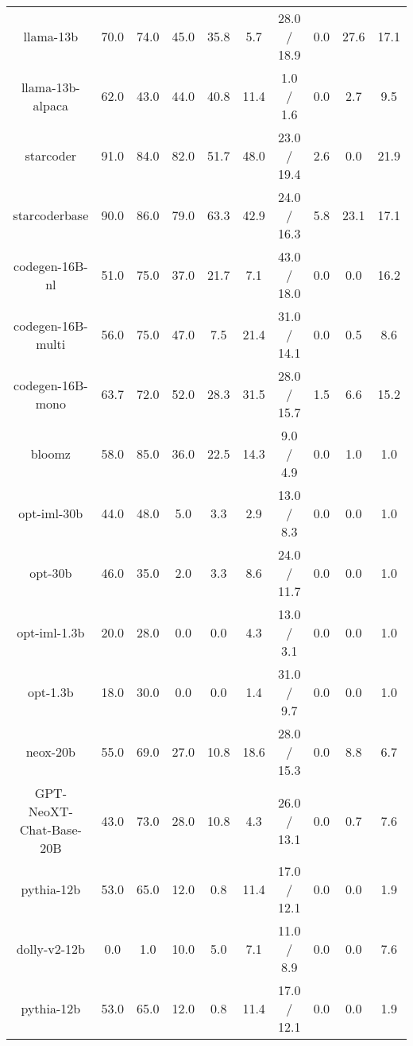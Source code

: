 \begin{table}[]
\begin{adjustbox}{max width=\textwidth}
\begin{tabular}{@{}cccccccccc@{}}
llama-13b               & 70.0 & 74.0 & 45.0 & 35.8 & 5.7  & 28.0 / 18.9 & 0.0 & 27.6 & 17.1 \\
llama-13b-alpaca   & 62.0 & 43.0 & 44.0 & 40.8 & 11.4 & 1.0 / 1.6   & 0.0 & 2.7  & 9.5  \\
\cmidrule(lr){1-1}
starcoder               & 91.0 & 84.0 & 82.0 & 51.7 & 48.0 & 23.0 / 19.4 & 2.6 & 0.0  & 21.9 \\
starcoderbase           & 90.0 & 86.0 & 79.0 & 63.3 & 42.9 & 24.0 / 16.3 & 5.8 & 23.1 & 17.1 \\
\cmidrule(lr){1-1}
codegen-16B-nl          & 51.0 & 75.0 & 37.0 & 21.7 & 7.1  & 43.0 / 18.0 & 0.0 & 0.0  & 16.2 \\
codegen-16B-multi       & 56.0 & 75.0 & 47.0 & 7.5  & 21.4 & 31.0 / 14.1 & 0.0 & 0.5  & 8.6  \\
codegen-16B-mono        & 63.7 & 72.0 & 52.0 & 28.3 & 31.5 & 28.0 / 15.7 & 1.5 & 6.6  & 15.2 \\
\cmidrule(lr){1-1}
bloomz                  & 58.0 & 85.0 & 36.0 & 22.5 & 14.3 & 9.0 / 4.9   & 0.0 & 1.0  & 1.0  \\
\cmidrule(lr){1-1}
opt-iml-30b             & 44.0 & 48.0 & 5.0  & 3.3  & 2.9  & 13.0 / 8.3  & 0.0 & 0.0  & 1.0  \\
opt-30b                 & 46.0 & 35.0 & 2.0  & 3.3  & 8.6  & 24.0 / 11.7 & 0.0 & 0.0  & 1.0  \\
opt-iml-1.3b            & 20.0 & 28.0 & 0.0  & 0.0  & 4.3  & 13.0 / 3.1  & 0.0 & 0.0  & 1.0  \\
opt-1.3b                & 18.0 & 30.0 & 0.0  & 0.0  & 1.4  & 31.0 / 9.7  & 0.0 & 0.0  & 1.0  \\
\cmidrule(lr){1-1}
neox-20b                & 55.0 & 69.0 & 27.0 & 10.8 & 18.6 & 28.0 / 15.3 & 0.0 & 8.8  & 6.7  \\
GPT-NeoXT-Chat-Base-20B & 43.0 & 73.0 & 28.0 & 10.8 & 4.3  & 26.0 / 13.1 & 0.0 & 0.7  & 7.6  \\
\cmidrule(lr){1-1}
pythia-12b              & 53.0 & 65.0 & 12.0 & 0.8  & 11.4 & 17.0 / 12.1 & 0.0 & 0.0  & 1.9  \\
dolly-v2-12b            & 0.0  & 1.0  & 10.0 & 5.0  & 7.1  & 11.0 / 8.9  & 0.0 & 0.0  & 7.6  \\
pythia-12b              & 53.0 & 65.0 & 12.0 & 0.8  & 11.4 & 17.0 / 12.1 & 0.0 & 0.0  & 1.9  \\

\end{tabular}
\end{adjustbox}
\end{table}
